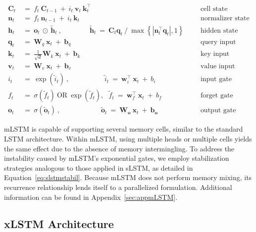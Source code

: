 \begin{align}
\label{eq:mlstm_recurrent_begin}
\mathbf{C}_t \ &= \  f_t \ \mathbf{C}_{t-1} \ + \ 
  i_t \ \mathbf{v}_t \ \mathbf{k}_t^\top & &  &\text{cell state} \\
\mathbf{n}_t \ &= \  f_t \ \mathbf{n}_{t-1} \ + \ 
  i_t \ \mathbf{k}_t & &  &\text{normalizer state} \\
\mathbf{h}_t  \ &= \ \mathbf{o}_t \ \odot \ \tilde{\mathbf{h}}_t
\ , \qquad \qquad 
\tilde{\mathbf{h}}_t \ = \   \mathbf{C}_t \mathbf{q}_t \ / \ 
  \max \left\{ |\mathbf{n}_t^\top \mathbf{q}_t|, 1 \right\} 
   &&&\text{hidden state} \\
\mathbf{q}_t \ &= \ \mathbf{W}_q \ \mathbf{x}_t \ + \ \mathbf{b}_q  & &  &\text{query input} \\
\mathbf{k}_t \ &= \ \frac{1}{\sqrt{d}} \mathbf{W}_k \ \mathbf{x}_t \ + \ \mathbf{b}_k  & &  &\text{key input} \\
\mathbf{v}_t \ &= \ \mathbf{W}_v \ \mathbf{x}_t \ + \ \mathbf{b}_v  & &  &\text{value input} \\
i_t \ &= \ \!\exp \!  \! \left( \tilde{i}_t  \right) \ , 
 \qquad \qquad \ \ \ \ \,
  \tilde{i}_t \ = \ \mathbf{w}^\top_{i} \ \mathbf{x}_t \ + \  b_{i} \ \ \ 
  &&&\text{input gate} \\
f_t \ &= \ \sigma \!  \left(  \tilde{f}_t \right) \ \text{OR} \ \!\exp \!  \! \left(  \tilde{f}_t \right) , \ \ \: \!
\tilde{f}_t \ = \ \mathbf{w}^\top_{f} \ \mathbf{x}_t  \ + \
  b_{f}
  &&& \text{forget gate} \\
\label{eq:mlstm_recurrent_end}
\mathbf{o}_t \ &= \ \sigma \left( \tilde{\mathbf{o}}_t \right) \ , \qquad \qquad \quad \ \ \ \,
  \tilde{\mathbf{o}}_t  \ = \ \mathbf{W}_{\mathbf{o}} \ \mathbf{x}_t \ + \
  \mathbf{b}_{\mathbf{o}}
  &&&\text{output gate} 
\end{align}

mLSTM is capable of supporting several memory cells, similar to the standard LSTM architecture. Within mLSTM, using multiple heads or multiple cells yields the same effect due to the absence of memory intermingling. To address the instability caused by mLSTM’s exponential gates, we employ stabilization strategies analogous to those applied in sLSTM, as detailed in Equation~\ref{eq:slstmstabil}. Because mLSTM does not perform memory mixing, its recurrence relationship lends itself to a parallelized formulation. Additional information can be found in Appendix~\ref{sec:appmLSTM}.

\subsection{xLSTM Architecture}
\label{sec:xLSTMarch}

